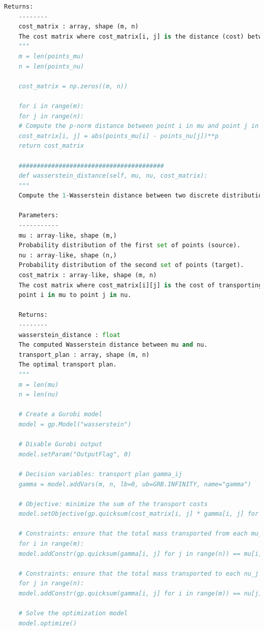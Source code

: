 \documentclass[a4paper,12pt]{article}
\begin{document}
\begin{lstlisting}[language=python,caption={class ScenarioTree},label={lst:class-scenario-tree}]
	Returns:
	--------
	cost_matrix : array, shape (m, n)
	The cost matrix where cost_matrix[i, j] is the distance (cost) between points_mu[i] and points_nu[j].
	"""
	m = len(points_mu)
	n = len(points_nu)
	
	cost_matrix = np.zeros((m, n))
	
	for i in range(m):
	for j in range(n):
	# Compute the p-norm distance between point i in mu and point j in nu
	cost_matrix[i, j] = abs(points_mu[i] - points_nu[j])**p
	return cost_matrix
	
	########################################	
	def wasserstein_distance(self, mu, nu, cost_matrix):
	"""
	Compute the 1-Wasserstein distance between two discrete distributions using Gurobi.
	
	Parameters:
	-----------
	mu : array-like, shape (m,)
	Probability distribution of the first set of points (source).
	nu : array-like, shape (n,)
	Probability distribution of the second set of points (target).
	cost_matrix : array-like, shape (m, n)
	The cost matrix where cost_matrix[i][j] is the cost of transporting mass from
	point i in mu to point j in nu.
	
	Returns:
	--------
	wasserstein_distance : float
	The computed Wasserstein distance between mu and nu.
	transport_plan : array, shape (m, n)
	The optimal transport plan.
	"""
	m = len(mu)
	n = len(nu)
	
	# Create a Gurobi model
	model = gp.Model("wasserstein")
	
	# Disable Gurobi output 
	model.setParam("OutputFlag", 0)
	
	# Decision variables: transport plan gamma_ij
	gamma = model.addVars(m, n, lb=0, ub=GRB.INFINITY, name="gamma")
	
	# Objective: minimize the sum of the transport costs
	model.setObjective(gp.quicksum(cost_matrix[i, j] * gamma[i, j] for i in range(m) for j in range(n)), GRB.MINIMIZE)
	
	# Constraints: ensure that the total mass transported from each mu_i matches the corresponding mass in mu
	for i in range(m):
	model.addConstr(gp.quicksum(gamma[i, j] for j in range(n)) == mu[i], name=f"supply_{i}")
	
	# Constraints: ensure that the total mass transported to each nu_j matches the corresponding mass in nu
	for j in range(n):
	model.addConstr(gp.quicksum(gamma[i, j] for i in range(m)) == nu[j], name=f"demand_{j}")
	
	# Solve the optimization model
	model.optimize()
	

\end{lstlisting}
\end{document}
